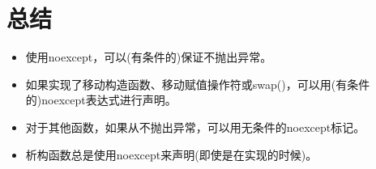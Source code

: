 \section{总结}
\begin{itemize}
	\item 使用noexcept，可以(有条件的)保证不抛出异常。
	\item 如果实现了移动构造函数、移动赋值操作符或swap()，可以用(有条件的)noexcept表达式进行声明。
	\item 对于其他函数，如果从不抛出异常，可以用无条件的noexcept标记。
	\item 析构函数总是使用noexcept来声明(即使是在实现的时候)。
\end{itemize}


